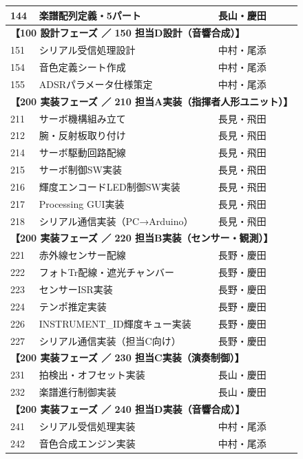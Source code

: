 \begin{longtable}{p{0.9cm}p{7cm}p{2.5cm}p{2cm}p{2cm}}
144 & 楽譜配列定義・5パート & 長山・慶田 &  &  \\
\midrule
\multicolumn{5}{l}{\textbf{【100 設計フェーズ ／ 150 担当D設計（音響合成）】}} \\
\midrule
151 & シリアル受信処理設計 & 中村・尾添 &  &  \\
154 & 音色定義シート作成 & 中村・尾添 &  &  \\
155 & ADSRパラメータ仕様策定 & 中村・尾添 &  &  \\
\midrule
\multicolumn{5}{l}{\textbf{【200 実装フェーズ ／ 210 担当A実装（指揮者人形ユニット）】}} \\
\midrule
211 & サーボ機構組み立て & 長見・飛田 &  &  \\
212 & 腕・反射板取り付け & 長見・飛田 &  &  \\
214 & サーボ駆動回路配線 & 長見・飛田 &  &  \\
215 & サーボ制御SW実装 & 長見・飛田 &  &  \\
216 & 輝度エンコードLED制御SW実装 & 長見・飛田 &  &  \\
217 & Processing GUI実装 & 長見・飛田 &  &  \\
218 & シリアル通信実装（PC→Arduino） & 長見・飛田 &  &  \\
\midrule
\multicolumn{5}{l}{\textbf{【200 実装フェーズ ／ 220 担当B実装（センサー・観測）】}} \\
\midrule
221 & 赤外線センサー配線 & 長野・慶田 &  &  \\
222 & フォトTr配線・遮光チャンバー & 長野・慶田 &  &  \\
223 & センサーISR実装 & 長野・慶田 &  &  \\
224 & テンポ推定実装 & 長野・慶田 &  &  \\
226 & INSTRUMENT\_ID輝度キュー実装 & 長野・慶田 &  &  \\
227 & シリアル通信実装（担当C向け） & 長野・慶田 &  &  \\
\midrule
\multicolumn{5}{l}{\textbf{【200 実装フェーズ ／ 230 担当C実装（演奏制御）】}} \\
\midrule
231 & 拍検出・オフセット実装 & 長山・慶田 &  &  \\
232 & 楽譜進行制御実装 & 長山・慶田 &  &  \\
\midrule
\multicolumn{5}{l}{\textbf{【200 実装フェーズ ／ 240 担当D実装（音響合成）】}} \\
\midrule
241 & シリアル受信処理実装 & 中村・尾添 &  &  \\
242 & 音色合成エンジン実装 & 中村・尾添 &  &  \\

\end{longtable}
